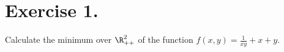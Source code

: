\section*{Exercise 1.}

Calculate the minimum over $\R^2_{++}$ of the function $f(x,y) = \frac{1}{xy} + x + y$.